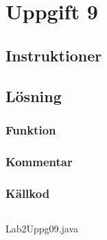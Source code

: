 \section{Uppgift 9}\label{sec:uppg09}

\subsection{Instruktioner}


\subsection{Lösning}
\subsubsection{Funktion}

\subsubsection{Kommentar}


\subsubsection{Källkod}
\inputminted[linenos]{java}{src/Lab2Uppg09.java}
\caption{Lab2Uppg09.java}
\label{src:uppg09}


